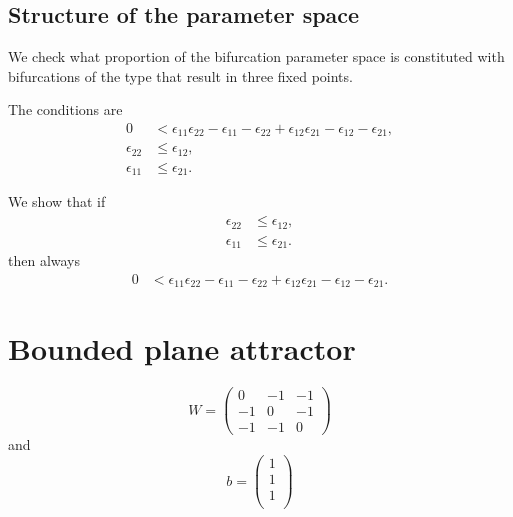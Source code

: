 \documentclass{article}
\theoremstyle{definition}
\theoremstyle{remark}
\begin{document}
\subsection{Structure of the parameter space}

We check what proportion of the bifurcation parameter space is constituted with bifurcations of the type that result in three fixed points.

The conditions are 
\begin{align*}
0 &< \epsilon_{11}\epsilon_{22}-\epsilon_{11}-\epsilon_{22}+\epsilon_{12}\epsilon_{21}-\epsilon_{12}-\epsilon_{21},\\
\epsilon_{22} &\leq \epsilon_{12},\\
\epsilon_{11} &\leq \epsilon_{21}.
\end{align*}


We show that if 
\begin{align*}
\epsilon_{22} &\leq \epsilon_{12},\\
\epsilon_{11} &\leq \epsilon_{21}.
\end{align*}
then always 
\begin{align*}
0 &< \epsilon_{11}\epsilon_{22}-\epsilon_{11}-\epsilon_{22}+\epsilon_{12}\epsilon_{21}-\epsilon_{12}-\epsilon_{21}.
\end{align*}










\newpage
\section{Bounded plane attractor}

\begin{equation}
W = 
\begin{pmatrix}
0  &  -1 & -1\\
-1  &  0 & -1\\
-1 &  -1 & 0	
\end{pmatrix}
\end{equation}
and
\begin{equation}
b = 
\begin{pmatrix}
1  \\
1 \\
1\\
\end{pmatrix}
\end{equation}
\end{document}
